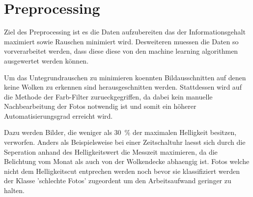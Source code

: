 \section{Preprocessing}
\label{sec:03_Preprocessing}
Ziel des Preprocessing ist es die Daten aufzubereiten das der
Informationsgehalt maximiert sowie Rauschen minimiert wird.
Desweiteren muessen die Daten so vorverarbeitet werden, dass diese
diese von den machine learning algorithmen ausgewertet werden können. 

Um das Untegrundrauschen zu minimieren koennten Bildausschnitten auf 
denen keine Wolken zu erkennen sind herausgeschnitten werden.
Stattdessen wird auf die Methode der Farb-Filter zurueckgegriffen, da dabei 
kein manuelle Nachbearbeitung der Fotos notwendig ist und somit ein höherer 
Automatisierungsgrad erreicht wird.

Dazu werden Bilder, die weniger als \SI{30}{\percent} der maximalen Helligkeit 
besitzen, verworfen. 
Anders als Beispielsweise bei einer Zeitschaltuhr laesst sich durch die
Seperation anhand des Helligkeitswert die Messzeit maximieren, da die 
Belichtung vom Monat als auch von der Wolkendecke abhaengig ist.
Fotos welche nicht dem Helligkeitscut entprechen werden noch bevor sie 
klassifiziert werden der Klasse 'schlechte Fotos' zugeordent um den 
Arbeitsaufwand geringer zu halten.

